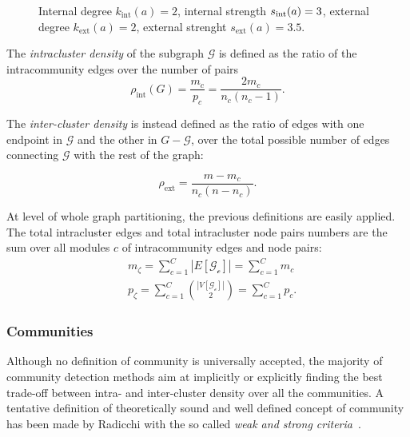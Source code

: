 \begin{figure}[htb]\centering
{}
\caption{Internal degree $k_{\textrm{int}}(a)=2$, internal strength $s_{\textrm{\textrm{int}}}(a)=3$, external degree $k_{\textrm{ext}}(a)=2$, external strenght $s_{\textrm{ext}}(a)=3.5$.}
\label{fig:internaldegree}
\end{figure}

The \emph{intracluster density} of the subgraph $\mathcal{G}$ is defined as the ratio of the intracommunity edges over the number of pairs 
\begin{equation}
\rho_{\textrm{int}}(G)=\frac{m_c}{p_c} = \frac{2 m_c}{n_c(n_c-1)}.
\end{equation}

The \emph{inter-cluster density} is instead defined as the ratio of edges with one endpoint in $\mathcal{G}$ and the other in $G-\mathcal{G}$, over the total possible number of edges connecting $\mathcal{G}$ with the rest of the graph: 

\begin{equation}
\rho_{\textrm{ext}}=\frac{m-m_c}{n_c(n-n_c)}.
\end{equation}

\noindent At level of whole graph partitioning, the previous definitions are easily applied. The total intracluster edges and total intracluster node pairs numbers are the sum over all modules $c$ of intracommunity edges and node pairs:
\begin{align}
&m_\zeta= \sum \limits_{c=1}^C |E[\mathcal{G_c}]| = \sum \limits_{c=1}^C m_c \\
&p_\zeta= \sum \limits_{c=1}^C \binom{|V[\mathcal{G_c}]|}{2} = \sum \limits_{c=1}^C p_c.
\end{align}

\subsubsection{Communities}
Although no definition of community is universally accepted, the majority of community detection methods aim at implicitly or explicitly finding the best trade-off between intra- and inter-cluster density over all the communities.
A tentative definition of theoretically sound and well defined concept of community has been made by Radicchi with the so called \emph{weak and strong criteria}~\cite{radicchi2004}.

